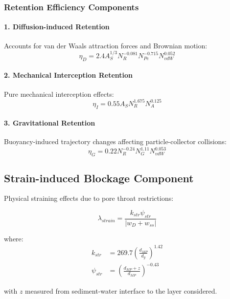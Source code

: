 \documentclass[11pt,a4paper]{article}
\begin{document}
\subsubsection{Retention Efficiency Components}

\paragraph{1. Diffusion-induced Retention}
Accounts for van der Waals attraction forces and Brownian motion:
\begin{equation}
\boxed{
\eta_D = 2.4 A_S^{1/3} N_R^{-0.081} N_{Pe}^{-0.715} N_{vdW}^{0.052}
}
\end{equation}

\paragraph{2. Mechanical Interception Retention}
Pure mechanical interception effects:
\begin{equation}
\boxed{
\eta_I = 0.55 A_S N_R^{1.675} N_A^{0.125}
}
\end{equation}

\paragraph{3. Gravitational Retention}
Buoyancy-induced trajectory changes affecting particle-collector collisions:
\begin{equation}
\boxed{
\eta_G = 0.22 N_R^{-0.24} N_G^{1.11} N_{vdW}^{0.053}
}
\end{equation}

\subsection{Strain-induced Blockage Component}

Physical straining effects due to pore throat restrictions:

\begin{equation}
\boxed{
\lambda_{strain} = \frac{k_{str}\psi_{str}}{|w_D + w_{ss}|}
}
\end{equation}

where:
\begin{align}
k_{str} &= 269.7\left(\frac{d_{MP}}{d_g}\right)^{1.42} \\[0.5em]
\psi_{str} &= \left(\frac{d_{MP}+z}{d_{MP}}\right)^{-0.43}
\end{align}

with $z$ measured from sediment-water interface to the layer considered.
\end{document}
